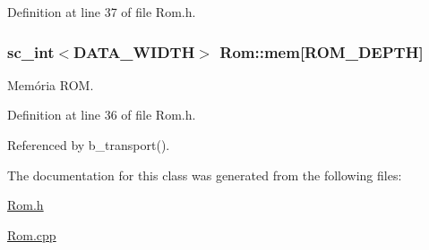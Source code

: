 Definition at line 37 of file Rom.\+h.

\hypertarget{classRom_aed8f55c20e5ba447c9d312b6bac82dcd}{
\subsubsection[{mem}]{\setlength{\rightskip}{0pt plus 5cm}sc\+\_\+int$<${\bf D\+A\+T\+A\+\_\+\+W\+I\+D\+T\+H}$>$ Rom\+::mem\mbox{[}{\bf R\+O\+M\+\_\+\+D\+E\+P\+T\+H}\mbox{]}\hspace{0.3cm}{\ttfamily [private]}}}\label{classRom_aed8f55c20e5ba447c9d312b6bac82dcd}
Memória R\+O\+M. 

Definition at line 36 of file Rom.\+h.



Referenced by b\+\_\+transport().



The documentation for this class was generated from the following files\+:\begin{DoxyCompactItemize}
\item 
\hyperlink{Rom_8h}{Rom.\+h}\item 
\hyperlink{Rom_8cpp}{Rom.\+cpp}\end{DoxyCompactItemize}

